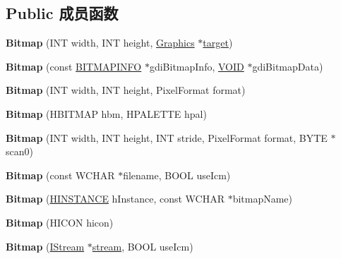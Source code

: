 \subsection*{Public 成员函数}
\begin{DoxyCompactItemize}
\item 
\mbox{\label{class_bitmap_a7611ce8c29b16979e542a140483537e0}} 
{\bfseries Bitmap} (I\+NT width, I\+NT height, \hyperlink{class_graphics}{Graphics} $\ast$\hyperlink{interfacevoid}{target})
\item 
\mbox{\label{class_bitmap_a8ced42f7a1c70066a1702e9ea3273717}} 
{\bfseries Bitmap} (const \hyperlink{structtag_b_i_t_m_a_p_i_n_f_o}{B\+I\+T\+M\+A\+P\+I\+N\+FO} $\ast$gdi\+Bitmap\+Info, \hyperlink{interfacevoid}{V\+O\+ID} $\ast$gdi\+Bitmap\+Data)
\item 
\mbox{\label{class_bitmap_ade2bbac2ee5dc0010eca99a6ce9ac866}} 
{\bfseries Bitmap} (I\+NT width, I\+NT height, Pixel\+Format format)
\item 
\mbox{\label{class_bitmap_af42638e1428befccf74cc91be47cd83a}} 
{\bfseries Bitmap} (H\+B\+I\+T\+M\+AP hbm, H\+P\+A\+L\+E\+T\+TE hpal)
\item 
\mbox{\label{class_bitmap_ab0e15ac99ef163e1933070ef4bd83cb9}} 
{\bfseries Bitmap} (I\+NT width, I\+NT height, I\+NT stride, Pixel\+Format format, B\+Y\+TE $\ast$scan0)
\item 
\mbox{\label{class_bitmap_a50d81f8db3d0319631c65791a5f0819e}} 
{\bfseries Bitmap} (const W\+C\+H\+AR $\ast$filename, B\+O\+OL use\+Icm)
\item 
\mbox{\label{class_bitmap_ab73cb1008c96078ad4e914654386b7f3}} 
{\bfseries Bitmap} (\hyperlink{interfacevoid}{H\+I\+N\+S\+T\+A\+N\+CE} h\+Instance, const W\+C\+H\+AR $\ast$bitmap\+Name)
\item 
\mbox{\label{class_bitmap_a703401753329542950f94ac49c52640e}} 
{\bfseries Bitmap} (H\+I\+C\+ON hicon)
\item 
\mbox{\label{class_bitmap_a7214a281301a88cfd766e9e216d6e805}} 
{\bfseries Bitmap} (\hyperlink{interface_i_stream}{I\+Stream} $\ast$\hyperlink{structstream}{stream}, B\+O\+OL use\+Icm)

\end{DoxyCompactItemize}
